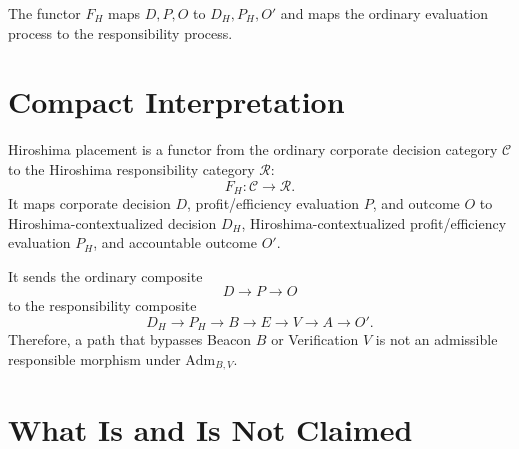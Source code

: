 \documentclass[11pt]{article}
\begin{document}
The functor $F_H$ maps $D,P,O$ to $D_H,P_H,O'$ and maps the ordinary evaluation
process to the responsibility process.

\section*{Compact Interpretation}

Hiroshima placement is a functor from the ordinary corporate decision category
$\mathcal{C}$ to the Hiroshima responsibility category $\mathcal{R}$:
\[
  F_H:\mathcal{C}\to\mathcal{R}.
\]
It maps corporate decision $D$, profit/efficiency evaluation $P$, and outcome
$O$ to Hiroshima-contextualized decision $D_H$, Hiroshima-contextualized
profit/efficiency evaluation $P_H$, and accountable outcome $O'$.

It sends the ordinary composite
\[
  D\to P\to O
\]
to the responsibility composite
\[
  D_H\to P_H\to B\to E\to V\to A\to O'.
\]
Therefore, a path that bypasses Beacon $B$ or Verification $V$ is not an
admissible responsible morphism under $\mathrm{Adm}_{B,V}$.

\section*{What Is and Is Not Claimed}
\end{document}
